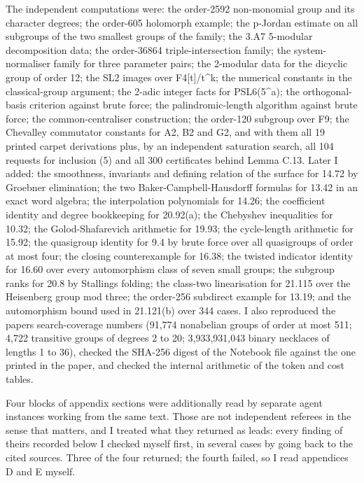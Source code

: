 The independent computations were: the order-2592 non-monomial group and
its character degrees; the order-605 holomorph example; the p-Jordan
estimate on all subgroups of the two smallest groups of the family; the
3.A7 5-modular decomposition data; the order-36864 triple-intersection
family; the system-normaliser family for three parameter pairs; the
2-modular data for the dicyclic group of order 12; the SL2 images over
F4{[}t{]}/t\^{}k; the numerical constants in the classical-group
argument; the 2-adic integer facts for PSL6(5\^{}a); the
orthogonal-basis criterion against brute force; the palindromic-length
algorithm against brute force; the common-centraliser construction; the
order-120 subgroup over F9; the Chevalley commutator constants for A2,
B2 and G2, and with them all 19 printed carpet derivations plus, by an
independent saturation search, all 104 requests for inclusion (5) and
all 300 certificates behind Lemma C.13. Later I added: the smoothness,
invariants and defining relation of the surface for 14.72 by Groebner
elimination; the two Baker-Campbell-Hausdorff formulas for 13.42 in an
exact word algebra; the interpolation polynomials for 14.26; the
coefficient identity and degree bookkeeping for 20.92(a); the Chebyshev
inequalities for 10.32; the Golod-Shafarevich arithmetic for 19.93; the
cycle-length arithmetic for 15.92; the quasigroup identity for 9.4 by
brute force over all quasigroups of order at most four; the closing
counterexample for 16.38; the twisted indicator identity for 16.60 over
every automorphism class of seven small groups; the subgroup ranks for
20.8 by Stallings folding; the class-two linearisation for 21.115 over
the Heisenberg group mod three; the order-256 subdirect example for
13.19; and the automorphism bound used in 21.121(b) over 344 cases. I
also reproduced the paper\textquotesingle s search-coverage numbers
(91,774 nonabelian groups of order at most 511; 4,722 transitive groups
of degrees 2 to 20; 3,933,931,043 binary necklaces of lengths 1 to 36),
checked the SHA-256 digest of the Notebook file against the one printed
in the paper, and checked the internal arithmetic of the token and cost
tables.

Four blocks of appendix sections were additionally read by separate
agent instances working from the same text. Those are not independent
referees in the sense that matters, and I treated what they returned as
leads: every finding of theirs recorded below I checked myself first, in
several cases by going back to the cited sources. Three of the four
returned; the fourth failed, so I read appendices D and E myself.

